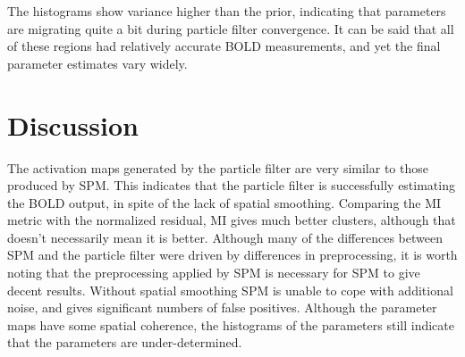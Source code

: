 The histograms show variance higher than the prior, indicating that
parameters are migrating quite a bit during particle filter convergence.
It can be said that all of these regions had relatively accurate \ac{BOLD}
measurements, and yet the final parameter estimates vary widely.

\section{Discussion}
The activation maps generated by the particle filter are very similar
to those produced by \ac{SPM}. This indicates that the particle filter is
successfully estimating the \ac{BOLD} output, in spite of the lack of spatial
smoothing. Comparing the \acl{MI} metric with the normalized residual,
\ac{MI} gives much better clusters, although that doesn't necessarily mean it
is better. Although many of the differences between \ac{SPM} and the particle filter
were driven by differences in preprocessing, it is worth noting that
the preprocessing applied by \ac{SPM} is necessary for \ac{SPM} to give decent results.
Without spatial smoothing \ac{SPM} is unable to cope with additional noise, and
gives significant numbers of false positives.
Although the parameter maps have some spatial coherence, the histograms
of the parameters still indicate that the parameters are under-determined.
